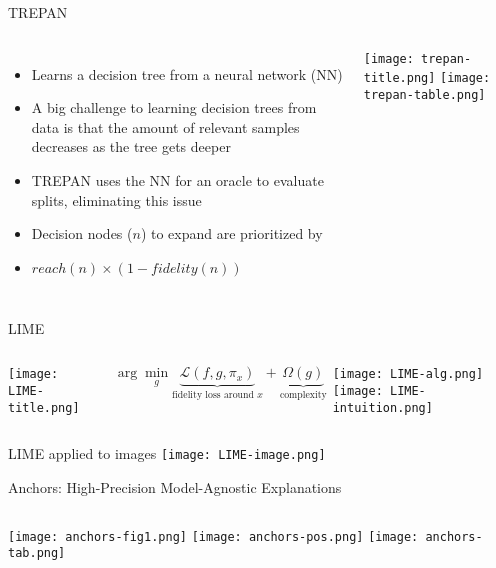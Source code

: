 \documentclass[aspectratio=169]{beamer}
\begin{document}

\begin{frame}{TREPAN}
\begin{columns}
	\begin{itemize}[<+->]
		\item Learns a decision tree from a neural network (NN)
		\item A big challenge to learning decision trees from data is that the amount of relevant samples decreases as the tree gets deeper
		\item TREPAN uses the NN for an oracle to evaluate splits, eliminating this issue
		\item Decision nodes ($n$) to expand are prioritized by
		\item[] $\mathit{reach}( n ) \times (1 - \mathit{fidelity}(n) )$
	\end{itemize}
	\column{6cm}
	\texttt{[image: trepan-title.png]}
	\texttt{[image: trepan-table.png]}
\end{columns}
\end{frame}


\begin{frame}{LIME}
\begin{columns}
	 \centering
	\texttt{[image: LIME-title.png]}
	
	{\color{UWRed}
	\[
	\arg \min_g \underbrace{ \mathcal L ( f, g, \pi_x ) }_{\text{fidelity loss around }x} + \underbrace{ \Omega( g ) }_\text{complexity}
	\]}
	
	\texttt{[image: LIME-alg.png]}
	 \centering
	\texttt{[image: LIME-intuition.png]}
\end{columns}
\end{frame}


\begin{frame}{LIME applied to images}
\texttt{[image: LIME-image.png]}
\end{frame}


\begin{frame}{Anchors: High-Precision Model-Agnostic Explanations}
\begin{columns}
	 \centering
	\texttt{[image: anchors-fig1.png]} \pause
	 \centering
	\texttt{[image: anchors-pos.png]} \pause
	\texttt{[image: anchors-tab.png]}	
\end{columns}
\end{frame}
\end{document}
